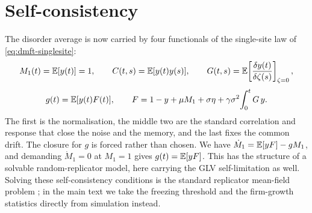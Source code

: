 \section{Self-consistency}
\label{sec:dmft-selfconsistency}

The disorder average is now carried by four functionals of the single-site law of
\eqref{eq:dmft-singlesite}:
\begin{equation}
    M_1(t) = \mathbb{E}[y(t)] = 1,\qquad
    C(t,s) = \mathbb{E}[y(t)y(s)],\qquad
    G(t,s) = \mathbb{E}\!\left[\frac{\delta y(t)}{\delta\zeta(s)}\right]_{\zeta=0},
\end{equation}
\begin{equation}
    g(t) = \mathbb{E}[y(t)F(t)],\qquad
    F = 1 - y + \mu M_1 + \sigma\eta + \gamma\sigma^2\!\int_0^t G\,y .
    \label{eq:dmft-closures}
\end{equation}
The first is the normalisation, the middle two are the standard correlation and response
that close the noise and the memory, and the last fixes the common drift. The closure for
$g$ is forced rather than chosen. We have $\dot M_1 = \mathbb{E}[yF] - g M_1$, and demanding $\dot M_1 = 0$
at $M_1 = 1$ gives $g(t) = \mathbb{E}[yF]$. This has the structure of a solvable random-replicator
model, here carrying the GLV self-limitation as well. Solving these self-consistency
conditions is the standard replicator mean-field problem \citep{galla2018,roy2020}; in the
main text we take the freezing threshold and the firm-growth statistics directly from
simulation instead.


